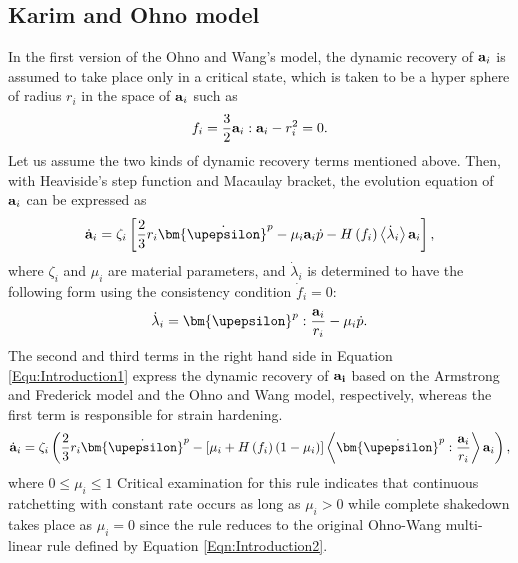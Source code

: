 \subsection{Karim and Ohno model}
In the first version of the Ohno and Wang's model, the dynamic recovery of ${{\bf{a}}_i}$ is assumed to take place only in a critical state, which is taken to be a hyper sphere of radius $r_i$ in the space of ${{\bf{a}}_i}$ such as
\begin{equation}
{f_i} = \frac{3}{2}{{\bf{a}}_i}:{{\bf{a}}_i} - r_i^2 = 0.
\end{equation}
Let us assume the two kinds of dynamic recovery terms mentioned above. Then, with Heaviside's step function and Macaulay bracket, the evolution equation of ${{\bf{a}}_i}$ can be expressed as
\begin{equation}
{{\dot{\bf a}}_i} = {\zeta _i}\left[ {\frac{2}{3}{r_i}{{{\bm{\dot \upepsilon }}}^p} - {\mu _i}{{\bf{a}}_i}\dot p - H\left( {{f_i}} \right)\left\langle {{{\dot \lambda }_i}} \right\rangle {{\bf{a}}_i}} \right],
\label{Equ:Introduction1}
\end{equation}
where $\zeta_i$ and $\mu_i$ are material parameters, and ${\dot \lambda }_i$ is determined to have the following form using the consistency condition ${\dot f_i} = 0$:
\begin{equation}
{\dot \lambda _i} = {{\bm{ \upepsilon }}^p}:\frac{{{{\bf{a}}_i}}}{{{r_i}}} - {\mu _i}\dot p.
\end{equation}
The second and third terms in the right hand side in Equation \ref{Equ:Introduction1} express the dynamic recovery of $\bf{a}_i$ based on the Armstrong and Frederick model and the Ohno and Wang model, respectively, whereas the first term is responsible for strain hardening.
\begin{equation}
{{\dot{\bf a}}_i} = {\zeta _i}\left( {\frac{2}{3}{r_i}{{{\bm{\dot \upepsilon }}}^p} - \left[ {{\mu _i} + H\left( {{f_i}} \right)\left( {1 - {\mu _i}} \right)} \right]\left\langle {{{{\bm{\dot \upepsilon }}}^p}:\frac{{{{\bf{a}}_i}}}{{{r_i}}}} \right\rangle {{\bf{a}}_i}} \right),
\end{equation}
where $0 \le {\mu _i} \le 1$ Critical examination for this rule indicates that continuous ratchetting with constant rate occurs as long as ${\mu _i} > 0$ while complete shakedown takes place as ${\mu _i} = 0$ since the rule reduces to the original Ohno-Wang multi-linear rule defined by Equation \ref{Eqn:Introduction2}.


